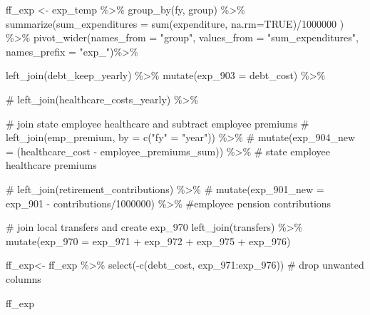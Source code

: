\documentclass[
  letterpaper,
  DIV=11,
  numbers=noendperiod]{scrreport}
\newenvironment{Shaded}{\begin{snugshade}}{\end{snugshade}}
\newcommand{\AttributeTok}[1]{\textcolor[rgb]{0.40,0.45,0.13}{#1}}
\newcommand{\CommentTok}[1]{\textcolor[rgb]{0.37,0.37,0.37}{#1}}
\newcommand{\ConstantTok}[1]{\textcolor[rgb]{0.56,0.35,0.01}{#1}}
\newcommand{\DecValTok}[1]{\textcolor[rgb]{0.68,0.00,0.00}{#1}}
\newcommand{\FunctionTok}[1]{\textcolor[rgb]{0.28,0.35,0.67}{#1}}
\newcommand{\NormalTok}[1]{\textcolor[rgb]{0.00,0.23,0.31}{#1}}
\newcommand{\OtherTok}[1]{\textcolor[rgb]{0.00,0.23,0.31}{#1}}
\newcommand{\SpecialCharTok}[1]{\textcolor[rgb]{0.37,0.37,0.37}{#1}}
\newcommand{\StringTok}[1]{\textcolor[rgb]{0.13,0.47,0.30}{#1}}
\begin{document}
\begin{Shaded}
\begin{Highlighting}[]
\NormalTok{ff\_exp }\OtherTok{\textless{}{-}}\NormalTok{ exp\_temp }\SpecialCharTok{\%\textgreater{}\%} 
  \FunctionTok{group\_by}\NormalTok{(fy, group) }\SpecialCharTok{\%\textgreater{}\%} 
  \FunctionTok{summarize}\NormalTok{(}\AttributeTok{sum\_expenditures =} \FunctionTok{sum}\NormalTok{(expenditure, }\AttributeTok{na.rm=}\ConstantTok{TRUE}\NormalTok{)}\SpecialCharTok{/}\DecValTok{1000000}\NormalTok{ ) }\SpecialCharTok{\%\textgreater{}\%}
  \FunctionTok{pivot\_wider}\NormalTok{(}\AttributeTok{names\_from =} \StringTok{"group"}\NormalTok{, }\AttributeTok{values\_from =} \StringTok{"sum\_expenditures"}\NormalTok{, }\AttributeTok{names\_prefix =} \StringTok{"exp\_"}\NormalTok{)}\SpecialCharTok{\%\textgreater{}\%}
  
    \FunctionTok{left\_join}\NormalTok{(debt\_keep\_yearly) }\SpecialCharTok{\%\textgreater{}\%}
  \FunctionTok{mutate}\NormalTok{(}\AttributeTok{exp\_903 =}\NormalTok{ debt\_cost) }\SpecialCharTok{\%\textgreater{}\%}

  \CommentTok{\#  left\_join(healthcare\_costs\_yearly) \%\textgreater{}\%}

  \CommentTok{\# join state employee healthcare and subtract employee premiums}
  \CommentTok{\# left\_join(emp\_premium, by = c("fy" = "year")) \%\textgreater{}\%}
\CommentTok{\#  mutate(exp\_904\_new = (\textasciigrave{}healthcare\_cost\textasciigrave{} {-} \textasciigrave{}employee\_premiums\_sum\textasciigrave{})) \%\textgreater{}\% \# state employee healthcare premiums}
  
 \CommentTok{\# left\_join(retirement\_contributions) \%\textgreater{}\%}
  \CommentTok{\#    mutate(exp\_901\_new = exp\_901 {-} contributions/1000000) \%\textgreater{}\% \#employee pension contributions}


  \CommentTok{\# join local transfers and create exp\_970}
  \FunctionTok{left\_join}\NormalTok{(transfers) }\SpecialCharTok{\%\textgreater{}\%}
  \FunctionTok{mutate}\NormalTok{(}\AttributeTok{exp\_970 =}\NormalTok{ exp\_971 }\SpecialCharTok{+}\NormalTok{ exp\_972  }\SpecialCharTok{+}\NormalTok{ exp\_975 }\SpecialCharTok{+}\NormalTok{ exp\_976)}

\NormalTok{ff\_exp}\OtherTok{\textless{}{-}}\NormalTok{ ff\_exp }\SpecialCharTok{\%\textgreater{}\%} 
  \FunctionTok{select}\NormalTok{(}\SpecialCharTok{{-}}\FunctionTok{c}\NormalTok{(debt\_cost, exp\_971}\SpecialCharTok{:}\NormalTok{exp\_976)) }\CommentTok{\# drop unwanted columns}

\NormalTok{ff\_exp}
\end{Highlighting}
\end{Shaded}
\end{document}
